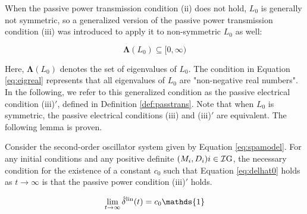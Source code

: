 \documentclass[graybox, envcountchap]{svmult}
\begin{document}
When the passive power transmission condition (ii) does not hold, $L_0$ is
generally not symmetric, so a generalized version of the passive power
transmission condition (iii) was introduced to apply it to non-symmetric $L_0$
as well:

\begin{equation}\label{eq:eigreal}
  \bm{\Lambda}(L_0)\subseteq [0,\infty)
\end{equation}

Here, $\bm{\Lambda}(L_0)$ denotes the set of eigenvalues of $L_0$. The condition
in Equation \ref{eq:eigreal} represents that all eigenvalues of $L_0$ are
"non-negative real numbers". In the following, we refer to this generalized
condition as the passive electrical condition (iii)$'$, defined in Definition
\ref{def:passtrans}. Note that when $L_0$ is symmetric, the passive electrical
conditions (iii) and (iii)$'$ are equivalent. The following lemma is proven.

\begin{lemma}\label{thm:2ndsys}
Consider the second-order oscillator system given by Equation \ref{eq:spamodel}.
For any initial conditions and any positive definite $(M_i,D_i){i \in
\mathcal{I}{\rm G}}$, the necessary condition for the existence of a constant
$c_0$ such that Equation \ref{eq:delhat0} holds as $t\rightarrow \infty$ is that
the passive power condition (iii)$'$ holds.

\begin{equation}\label{eq:delhat0}
  \lim_{t\rightarrow \infty} \hat{\delta}^{\rm lin}(t)= c_0 \mathds{1}
\end{equation}

\end{lemma}
\end{document}
